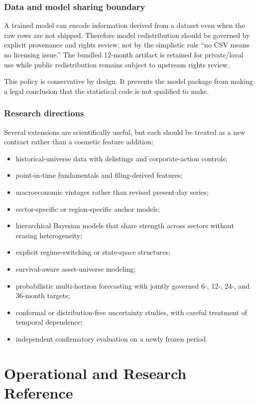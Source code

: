 \documentclass[11pt]{article}
\begin{document}
\section{Data and model sharing boundary}

A trained model can encode information derived from a dataset even when the raw rows are not shipped. Therefore model redistribution should be governed by explicit provenance and rights review, not by the simplistic rule ``no CSV means no licensing issue.'' The bundled 12-month artifact is retained for private/local use while public redistribution remains subject to upstream rights review.

This policy is conservative by design. It prevents the model package from making a legal conclusion that the statistical code is not qualified to make.

\section{Research directions}

Several extensions are scientifically useful, but each should be treated as a new contract rather than a cosmetic feature addition:

\begin{itemize}
\item historical-universe data with delistings and corporate-action controls;
\item point-in-time fundamentals and filing-derived features;
\item macroeconomic vintages rather than revised present-day series;
\item sector-specific or region-specific anchor models;
\item hierarchical Bayesian models that share strength across sectors without erasing heterogeneity;
\item explicit regime-switching or state-space structures;
\item survival-aware asset-universe modeling;
\item probabilistic multi-horizon forecasting with jointly governed 6-, 12-, 24-, and 36-month targets;
\item conformal or distribution-free uncertainty studies, with careful treatment of temporal dependence;
\item independent confirmatory evaluation on a newly frozen period.
\end{itemize}

\part{Operational and Research Reference}
\end{document}
